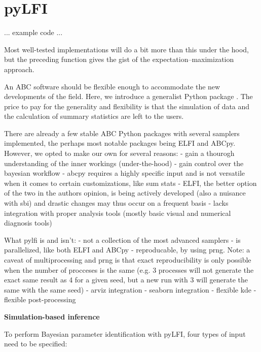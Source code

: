 \section{pyLFI}\label{sec:pylfi}

... example code ...

Most well-tested implementations will do a bit more than this under the hood, but the preceding function gives the gist of the expectation–maximization approach.

An ABC software should be flexible enough to accommodate the new developments of the field. Here, we introduce a generalist Python package . The price to pay for the generality and flexibility is that the simulation of data and the calculation of summary statistics are left to the users. 

There are already a few stable ABC Python packages with several samplers implemented, the perhaps most notable packages being ELFI and ABCpy. However, we opted to make our own for several reasons:
- gain a thourogh understanding of the inner workings (under-the-hood)
- gain control over the bayesian workflow 
- abcpy requires a highly specific input and is not versatile when it comes to certain customizations, like sum stats
- ELFI, the better option of the two in the authors opinion, is being actively developed (also a nuisance with sbi) and drastic changes may thus occur on a frequent basis
- lacks integration with proper analysis tools (mostly basic visual and numerical diagnosis tools)

What pylfi is and isn’t:
- not a collection of the most advanced samplers
- is parallelized, like both ELFI and ABCpy
- reproducable, by using prng. Note: a caveat of multiprocessing and prng is that exact reproducibility is only possible when the number of procceses is the same (e.g. 3 processes will not generate the exact same result as 4 for a given seed, but a new run with 3 will generate the same with the same seed)
- arviz integration
- seaborn integration
- flexible kde
- flexible post-processing


\textbf{Simulation-based inference} 


To perform Bayesian parameter identification with pyLFI, four types of input need to be specified: 

